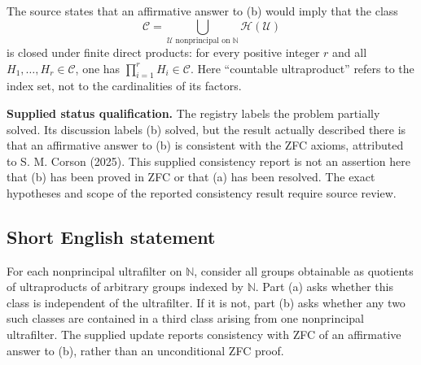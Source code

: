 \documentclass[11pt]{article}
\newcommand{\N}{\mathbb{N}}
\begin{document}
The source states that an affirmative answer to (b) would imply that the class
\[
\mathcal C=\bigcup_{\mathscr U\text{ nonprincipal on }\N}\mathcal H(\mathscr U)
\]
is closed under finite direct products: for every positive integer \(r\) and all \(H_1,\ldots,H_r\in\mathcal C\), one has \(\prod_{i=1}^r H_i\in\mathcal C\). Here ``countable ultraproduct'' refers to the index set, not to the cardinalities of its factors.

\textbf{Supplied status qualification.} The registry labels the problem partially solved. Its discussion labels (b) solved, but the result actually described there is that an affirmative answer to (b) is consistent with the ZFC axioms, attributed to S. M. Corson (2025). This supplied consistency report is not an assertion here that (b) has been proved in ZFC or that (a) has been resolved. The exact hypotheses and scope of the reported consistency result require source review.
\subsection{Short English statement}
For each nonprincipal ultrafilter on \(\N\), consider all groups obtainable as quotients of ultraproducts of arbitrary groups indexed by \(\N\). Part (a) asks whether this class is independent of the ultrafilter. If it is not, part (b) asks whether any two such classes are contained in a third class arising from one nonprincipal ultrafilter. The supplied update reports consistency with ZFC of an affirmative answer to (b), rather than an unconditional ZFC proof.
\end{document}
